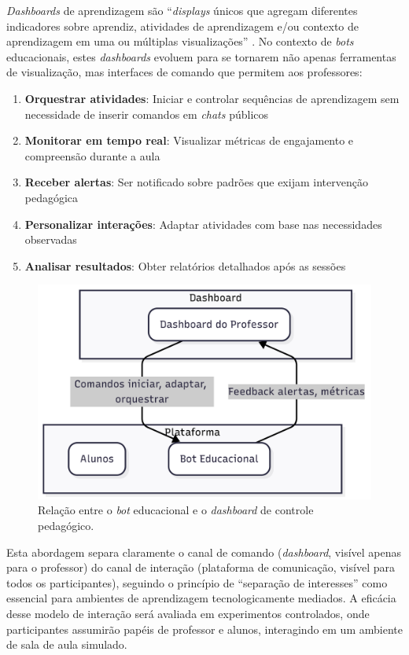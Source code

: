 \textit{Dashboards} de aprendizagem são ``\textit{displays} únicos que agregam
diferentes indicadores sobre aprendiz, atividades de aprendizagem e/ou contexto
de aprendizagem em uma ou múltiplas visualizações'' \cite{verbert2013}. No
contexto de \textit{bots} educacionais, estes \textit{dashboards} evoluem para
se tornarem não apenas ferramentas de visualização, mas interfaces de comando
que permitem aos professores:

\begin{enumerate}
\item \textbf{Orquestrar atividades}: Iniciar e controlar sequências de
aprendizagem sem necessidade de inserir comandos em \textit{chats} públicos
\item \textbf{Monitorar em tempo real}: Visualizar métricas de engajamento e
compreensão durante a aula
\item \textbf{Receber alertas}: Ser notificado sobre padrões que exijam
intervenção pedagógica
\item \textbf{Personalizar interações}: Adaptar atividades com base nas
necessidades observadas
\item \textbf{Analisar resultados}: Obter relatórios detalhados após as sessões
\end{enumerate}

\begin{figure}[H] \centering
\includegraphics[width=12cm]{relacao-dashboard-bot.png}
\caption{Relação entre o \textit{bot} educacional e o \textit{dashboard} de
controle pedagógico.}
\label{fig:dashboard-bot}
\end{figure}

Esta abordagem separa claramente o canal de comando (\textit{dashboard}, visível
apenas para o professor) do canal de interação (plataforma de comunicação,
visível para todos os participantes), seguindo o princípio de ``separação de
interesses'' \cite{huang2021} como essencial para ambientes de aprendizagem
tecnologicamente mediados. A eficácia desse modelo de interação será avaliada em
experimentos controlados, onde participantes assumirão papéis de professor e
alunos, interagindo em um ambiente de sala de aula simulado.

